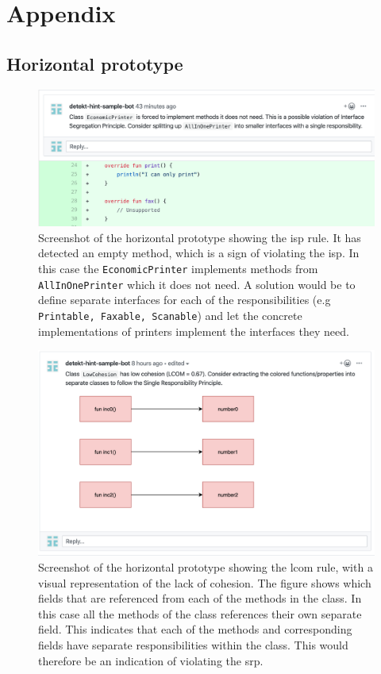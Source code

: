 \clearpage
\chapter{Appendix}

\section{Horizontal prototype}
\label{horizontal-prototype-images}

\begin{figure}[h!]
    \centering
    \includegraphics[width=\textwidth]{../images/comment_isp.png}
    \caption{Screenshot of the horizontal prototype showing the \gls{isp} rule. It has detected an empty method, which is a sign of violating the \gls{isp}. In this case the \texttt{EconomicPrinter} implements methods from \texttt{AllInOnePrinter} which it does not need. A solution would be to define separate interfaces for each of the responsibilities (e.g \texttt{Printable, Faxable, Scanable}) and let the concrete implementations of printers implement the interfaces they need.}
    \label{fig:isp}
\end{figure}


\begin{figure}[h!]
    \centering
    \includegraphics[width=\textwidth]{../images/comment_lackOfCohesion.png}
    \caption{Screenshot of the horizontal prototype showing the \gls{lcom} rule, with a visual representation of the lack of cohesion. The figure shows which fields that are referenced from each of the methods in the class. In this case all the methods of the class references their own separate field. This indicates that each of the methods and corresponding fields have separate responsibilities within the class. This would therefore be an indication of violating the \gls{srp}.}
    \label{fig:lcom}
\end{figure}


